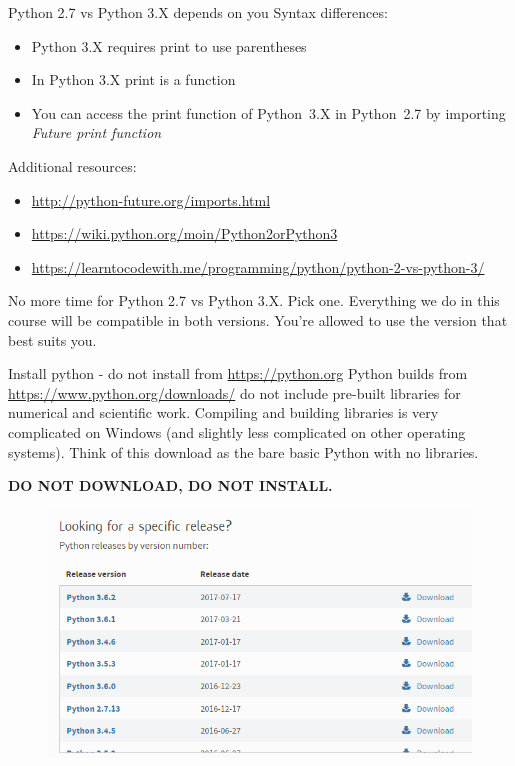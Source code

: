 \documentclass[10pt]{beamer}
\begin{document}
\begin{frame}{Python 2.7 vs Python 3.X depends on you}
Syntax differences:
\begin{itemize}
\item Python 3.X requires print to use parentheses
\item In Python 3.X print is a function
\item You can access the print function of Python~3.X in Python~2.7 by importing \textit{Future print function}
\end{itemize}


Additional resources:
\begin{itemize}
\item \url{http://python-future.org/imports.html}
\item \url{https://wiki.python.org/moin/Python2orPython3}
\item \url{https://learntocodewith.me/programming/python/python-2-vs-python-3/}
\end{itemize}

No more time for Python 2.7 vs Python 3.X. Pick one. Everything we do in this course will be compatible in both versions. You're allowed to use the version that best suits you. 
\end{frame}

\begin{frame}{Install python - do not install from \url{https://python.org}}
Python builds from \url{https://www.python.org/downloads/} do not include pre-built libraries for numerical and scientific work. Compiling and building libraries is very complicated on Windows (and slightly less complicated on other operating systems). Think of this download as the bare basic Python with no libraries.

\textbf{DO NOT DOWNLOAD, DO NOT INSTALL.}
\begin{figure}
 	\includegraphics[width=1.0\textwidth]{figs/pythonVer.png}
\end{figure}
\end{frame}
\end{document}
